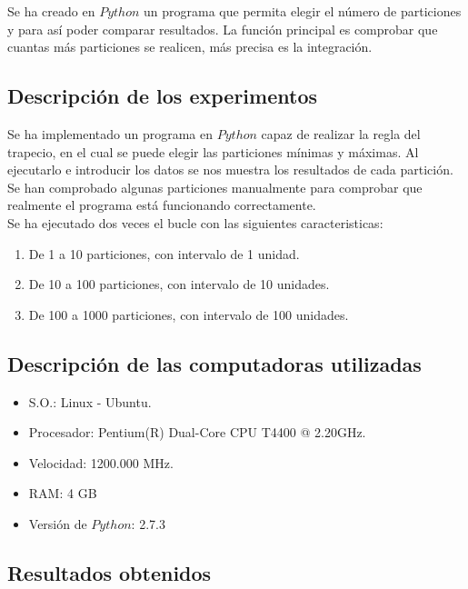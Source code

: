 \documentclass{article}
\begin{document}
   Se ha creado en $Python$ un programa que permita elegir el número de particiones y para así poder comparar resultados. La función principal es comprobar que cuantas más particiones se realicen, más precisa es la integración.
    
    \subsection{Descripción de los experimentos}

   Se ha implementado un programa en $Python$ capaz de realizar la regla del trapecio, en el cual se puede elegir las particiones mínimas y máximas. Al ejecutarlo e introducir los datos se nos muestra los resultados de cada partición.\\

   Se han comprobado algunas particiones manualmente para comprobar que realmente el programa está funcionando correctamente.\\

   Se ha ejecutado dos veces el bucle con las siguientes caracteristicas:
 
   \begin{enumerate}
     \item De 1 a 10 particiones, con intervalo de 1 unidad.
     \item De 10 a 100 particiones, con intervalo de 10 unidades.
     \item De 100 a 1000 particiones, con intervalo de 100 unidades.
   \end{enumerate}

    \subsection{Descripción de las computadoras utilizadas}

      \begin{itemize}
        \item S.O.: Linux - Ubuntu.
        \item Procesador: Pentium(R) Dual-Core CPU  T4400  @ 2.20GHz.
        \item Velocidad: 1200.000 MHz.
        \item RAM: 4 GB
        \item Versión de $Python$: 2.7.3
      \end{itemize}

    \subsection{Resultados obtenidos}
\end{document}
